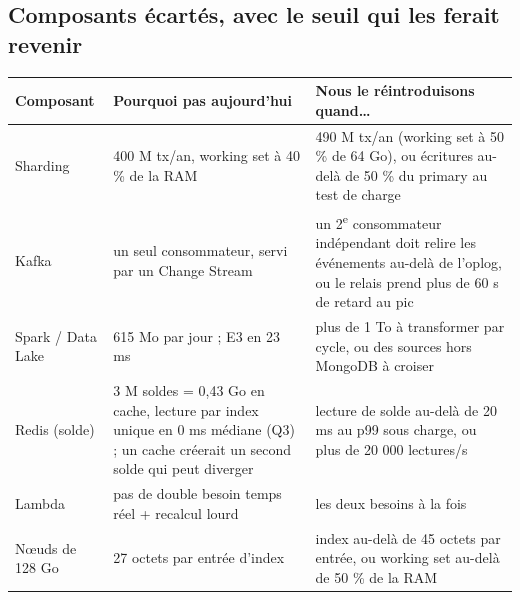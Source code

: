 \documentclass[11pt,a4paper]{article}
\begin{document}
	\subsection{Composants écartés, avec le seuil qui les ferait revenir}
	\begin{center}\small
		\begin{tabularx}{\linewidth}{@{}P{2.6cm}LL@{}}
			\toprule
			\textbf{Composant} & \textbf{Pourquoi pas aujourd'hui} & \textbf{Nous le réintroduisons quand…} \\
			\midrule
			Sharding & 400 M tx/an, working set à 40 \% de la RAM & 490 M tx/an (working set à 50 \% de 64 Go), ou écritures au-delà de 50 \% du primary au test de charge \\
			Kafka & un seul consommateur, servi par un Change Stream & un 2\textsuperscript{e} consommateur indépendant doit relire les événements au-delà de l'oplog, ou le relais prend plus de 60 s de retard au pic \\
			Spark / Data Lake & 615 Mo par jour ; E3 en 23 ms & plus de 1 To à transformer par cycle, ou des sources hors MongoDB à croiser \\
			Redis (solde) & 3 M soldes = 0,43 Go en cache, lecture par index unique en 0 ms médiane (Q3) ; un cache créerait un second solde qui peut diverger & lecture de solde au-delà de 20 ms au p99 sous charge, ou plus de 20 000 lectures/s \\
			Lambda & pas de double besoin temps réel + recalcul lourd & les deux besoins à la fois \\
			Nœuds de 128 Go & 27 octets par entrée d'index & index au-delà de 45 octets par entrée, ou working set au-delà de 50 \% de la RAM \\
			\bottomrule
		\end{tabularx}
	\end{center}
	
\end{document}
